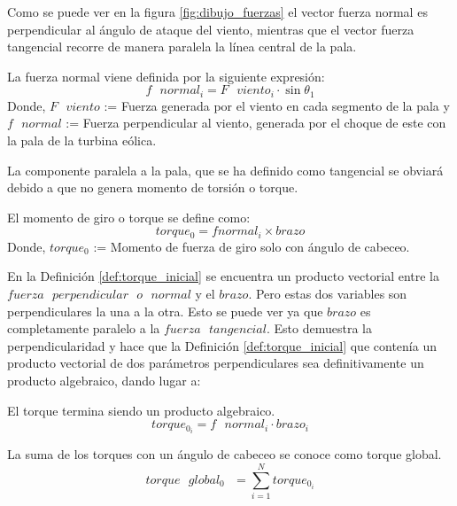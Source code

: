 Como se puede ver en la figura \ref{fig:dibujo_fuerzas} el vector fuerza normal es perpendicular al ángulo de ataque del viento, mientras que el vector fuerza tangencial recorre de manera paralela la línea central de la pala.


 \begin{definicion}
 La fuerza normal viene definida por la siguiente expresión:
  $$ f \text{ } normal_i = F \text{ } viento_i \cdot \sin{\theta_1}$$
Donde,
\centering $F \text{ } viento$ := Fuerza generada por el viento en cada segmento de la pala y $f \text{ } normal$ := Fuerza perpendicular al viento, generada por el choque de este con la pala de la turbina eólica.
 \label{def:fuerza_normal}
 \end{definicion}
 
  La componente paralela a la pala, que se ha definido como tangencial se obviará debido a que no genera momento de torsión o torque. 
  
  \begin{definicion}
El momento de giro o torque se define como:
 $$ torque_0 = f normal_i \times brazo$$
Donde,
\centering $torque_0$ := Momento de fuerza de giro solo con ángulo de cabeceo.
  \label{def:torque_inicial}
 \end{definicion}
 

 En la Definición \ref{def:torque_inicial} se encuentra un producto vectorial entre la $fuerza  \text{ }perpendicular \text{ } o \text{ } normal$ y el $brazo$. Pero estas dos variables son perpendiculares la una a la otra. Esto se puede ver ya que $brazo$ es completamente paralelo a la $fuerza \text{ } tangencial$. Esto demuestra la perpendicularidad y hace que la Definición \ref{def:torque_inicial} que contenía un producto vectorial de dos parámetros perpendiculares sea definitivamente un producto algebraico, dando lugar a:
 
 
  \begin{definicion}
  El torque termina siendo un producto algebraico.
 $$ torque_0_{i} = f \text{ } normal_i \cdot brazo_i$$
 \label{def:torque_algebraico_inicial}
 \end{definicion}
 
 
 \begin{definicion}
 La suma de los torques con un ángulo de cabeceo se conoce como torque global.
 $$ torque \text{ } global_0 \text{ } = \sum_{i=1}^{N} torque_0_{i} $$
\label{def:torque_global}
\end{definicion}
 

